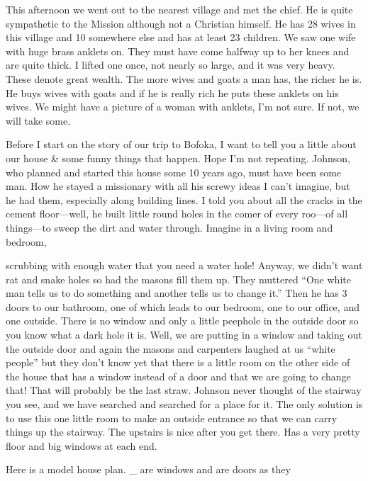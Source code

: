 \documentclass[
]{book}
\begin{document}
This afternoon we went out to the nearest village and met the chief. He is quite sympathetic to the Mission although not a Christian himself. He has 28 wives in this village and 10 somewhere else and has at least 23 children. We saw one wife with huge brass anklets on. They must have come halfway up to her knees and are quite thick. I lifted one once, not nearly so large, and it was very heavy. These denote great wealth. The more wives and goats a man has, the richer he is. He buys wives with goats and if he is really rich he puts these anklets on his wives. We might have a picture of a woman with anklets, I'm not sure. If not, we will take some.

Before I start on the story of our trip to Bofoka, I want to tell you a little about our house \& some funny things that happen. Hope I'm not repeating. Johnson, who planned and started this house some 10 years ago, must have been some man. How he stayed a missionary with all his screwy ideas I can't imagine, but he had them, especially along building lines. I told you about all the cracks in the cement floor---well, he built little round holes in the comer of every roo---of all things---to sweep the dirt and water through. Imagine in a living room and bedroom,

scrubbing with enough water that you need a water hole! Anyway, we didn't want rat and snake holes so had the masons fill them up. They muttered ``One white man tells us to do something and another tells us to change it.'' Then he has 3 doors to our bathroom, one of which leads to our bedroom, one to our office, and one outside. There is no window and only a little peephole in the outside door so you know what a dark hole it is. Well, we are putting in a window and taking out the outside door and again the masons and carpenters laughed at us ``white people'' but they don't know yet that there is a little room on the other side of the house that has a window instead of a door and that we are going to change that! That will probably be the last straw. Johnson never thought of the stairway you see, and we have searched and searched for a place for it. The only solution is to use this one little room to make an outside entrance so that we can carry things up the stairway. The upstairs is nice after you get there. Has a very pretty floor and big windows at each end.

Here is a model house plan. \textbar\_\textbar{} are windows and \textbar\textbar{} are doors as they
\end{document}
